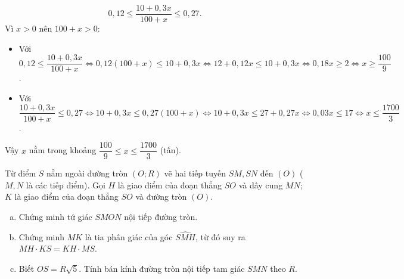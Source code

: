 \begin{bt}
{\begin{enumerate}[a)]
	$$0{,}12 \le \dfrac{10 + 0{,}3x}{100 + x} \le 0{,}27.$$
	Vì $x > 0$ nên $100 + x > 0$:
	\begin{itemize}
		\item Với $0{,}12 \le \dfrac{10 + 0{,}3x}{100 + x} \iff 0{,}12(100 + x) \le 10 + 0{,}3x \iff 12 + 0{,}12x \le 10 + 0{,}3x \iff 0{,}18x \ge 2 \iff x \ge \dfrac{100}{9}$.
		\item Với $\dfrac{10 + 0{,}3x}{100 + x} \le 0{,}27 \iff 10 + 0{,}3x \le 0{,}27(100 + x) \iff 10 + 0{,}3x \le 27 + 0{,}27x \iff 0{,}03x \le 17 \iff x \le \dfrac{1700}{3}$.
	\end{itemize}
	Vậy $x$ nằm trong khoảng $\dfrac{100}{9} \le x \le \dfrac{1700}{3}$ (tấn).
\end{enumerate}
}
\end{bt}

\begin{bt}%
Từ điểm $S$ nằm ngoài đường tròn $(O; R)$ vẽ hai tiếp tuyến $SM, SN$ đến $(O)$ ($M, N$ là các tiếp điểm). Gọi $H$ là giao điểm của đoạn thẳng $SO$ và dây cung $MN$; $K$ là giao điểm của đoạn thẳng $SO$ và đường tròn $(O)$.
\begin{enumerate}[a)]
	\item Chứng minh tứ giác $SMON$ nội tiếp đường tròn.
	\item Chứng minh $MK$ là tia phân giác của góc $\widehat{SMH}$, từ đó suy ra $MH \cdot KS = KH \cdot MS$.
	\item Biết $OS = R\sqrt{5}$. Tính bán kính đường tròn nội tiếp tam giác $SMN$ theo $R$.
\end{enumerate}
\end{bt}
